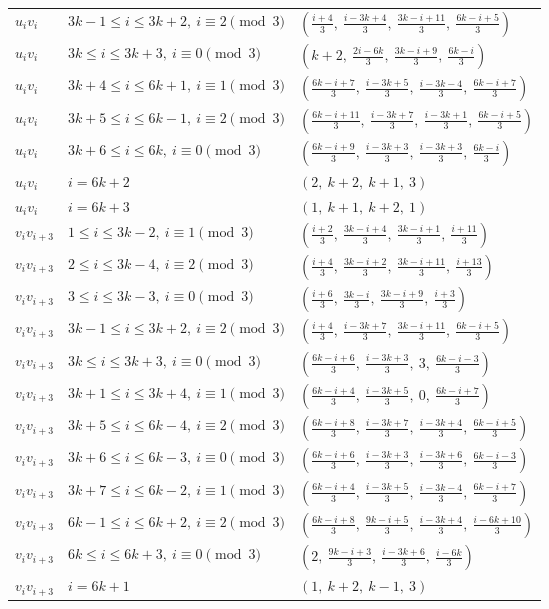 \begin{longtable}{lll}
$u_i v_i$ & $3k-1 \le i \le 3k+2,\ i \equiv 2 \pmod{3}$ & $(\frac{i+4}{3},\ \frac{i-3k+4}{3},\ \frac{3k-i+11}{3},\ \frac{6k-i+5}{3})$ \\
$u_i v_i$ & $3k \le i \le 3k+3,\ i \equiv 0 \pmod{3}$ & $(k+2,\ \frac{2i-6k}{3},\ \frac{3k-i+9}{3},\ \frac{6k-i}{3})$ \\
$u_i v_i$ & $3k+4 \le i \le 6k+1,\ i \equiv 1 \pmod{3}$ & $(\frac{6k-i+7}{3},\ \frac{i-3k+5}{3},\ \frac{i-3k-4}{3},\ \frac{6k-i+7}{3})$ \\
$u_i v_i$ & $3k+5 \le i \le 6k-1,\ i \equiv 2 \pmod{3}$ & $(\frac{6k-i+11}{3},\ \frac{i-3k+7}{3},\ \frac{i-3k+1}{3},\ \frac{6k-i+5}{3})$ \\
$u_i v_i$ & $3k+6 \le i \le 6k,\ i \equiv 0 \pmod{3}$ & $(\frac{6k-i+9}{3},\ \frac{i-3k+3}{3},\ \frac{i-3k+3}{3},\ \frac{6k-i}{3})$ \\
$u_i v_i$ & $i = 6k+2$ & $(2,\ k+2,\ k+1,\ 3)$ \\
$u_i v_i$ & $i = 6k+3$ & $(1,\ k+1,\ k+2,\ 1)$ \\
$v_i v_{i+3}$ & $1 \le i \le 3k-2,\ i \equiv 1 \pmod{3}$ & $(\frac{i+2}{3},\ \frac{3k-i+4}{3},\ \frac{3k-i+1}{3},\ \frac{i+11}{3})$ \\
$v_i v_{i+3}$ & $2 \le i \le 3k-4,\ i \equiv 2 \pmod{3}$ & $(\frac{i+4}{3},\ \frac{3k-i+2}{3},\ \frac{3k-i+11}{3},\ \frac{i+13}{3})$ \\
$v_i v_{i+3}$ & $3 \le i \le 3k-3,\ i \equiv 0 \pmod{3}$ & $(\frac{i+6}{3},\ \frac{3k-i}{3},\ \frac{3k-i+9}{3},\ \frac{i+3}{3})$ \\
$v_i v_{i+3}$ & $3k-1 \le i \le 3k+2,\ i \equiv 2 \pmod{3}$ & $(\frac{i+4}{3},\ \frac{i-3k+7}{3},\ \frac{3k-i+11}{3},\ \frac{6k-i+5}{3})$ \\
$v_i v_{i+3}$ & $3k \le i \le 3k+3,\ i \equiv 0 \pmod{3}$ & $(\frac{6k-i+6}{3},\ \frac{i-3k+3}{3},\ 3,\ \frac{6k-i-3}{3})$ \\
$v_i v_{i+3}$ & $3k+1 \le i \le 3k+4,\ i \equiv 1 \pmod{3}$ & $(\frac{6k-i+4}{3},\ \frac{i-3k+5}{3},\ 0,\ \frac{6k-i+7}{3})$ \\
$v_i v_{i+3}$ & $3k+5 \le i \le 6k-4,\ i \equiv 2 \pmod{3}$ & $(\frac{6k-i+8}{3},\ \frac{i-3k+7}{3},\ \frac{i-3k+4}{3},\ \frac{6k-i+5}{3})$ \\
$v_i v_{i+3}$ & $3k+6 \le i \le 6k-3,\ i \equiv 0 \pmod{3}$ & $(\frac{6k-i+6}{3},\ \frac{i-3k+3}{3},\ \frac{i-3k+6}{3},\ \frac{6k-i-3}{3})$ \\
$v_i v_{i+3}$ & $3k+7 \le i \le 6k-2,\ i \equiv 1 \pmod{3}$ & $(\frac{6k-i+4}{3},\ \frac{i-3k+5}{3},\ \frac{i-3k-4}{3},\ \frac{6k-i+7}{3})$ \\
$v_i v_{i+3}$ & $6k-1 \le i \le 6k+2,\ i \equiv 2 \pmod{3}$ & $(\frac{6k-i+8}{3},\ \frac{9k-i+5}{3},\ \frac{i-3k+4}{3},\ \frac{i-6k+10}{3})$ \\
$v_i v_{i+3}$ & $6k \le i \le 6k+3,\ i \equiv 0 \pmod{3}$ & $(2,\ \frac{9k-i+3}{3},\ \frac{i-3k+6}{3},\ \frac{i-6k}{3})$ \\
$v_i v_{i+3}$ & $i = 6k+1$ & $(1,\ k+2,\ k-1,\ 3)$ \\
\hline
\end{longtable}

